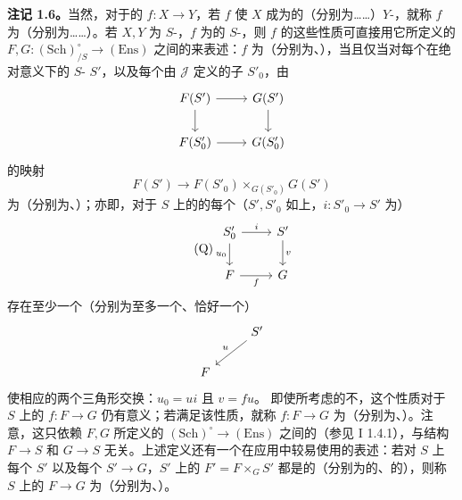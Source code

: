 \textbf{注记 1.6。}当然，对于的 $f:X\to Y$，若 $f$ 使 $X$ 成为的（分别为……）$Y$-，就称 $f$ 为（分别为……）。若 $X,Y$ 为 $S$-，$f$ 为的 $S$-，则 $f$ 的这些性质可直接用它所定义的 $F,G:(\mathrm{Sch})^{\circ}_{/S}\to(\mathrm{Ens})$ 之间的来表述：$f$ 为（分别为、），当且仅当对每个在绝对意义下的 $S$- $S'$，以及每个由 $\mathscr J$ 定义的子 $S'_0$，由
\[\begin{tikzcd}F(S')\arrow[r]\arrow[d]&G(S')\arrow[d]\\F(S'_0)\arrow[r]&G(S'_0)\end{tikzcd}\]
的映射
\[F(S')\longrightarrow F(S'_0)\times_{G(S'_0)}G(S')\]
为（分别为、）；亦即，对于 $S$ 上的的每个（$S',S'_0$ 如上，$i:S'_0\to S'$ 为）
\[\tag{Q}\begin{tikzcd}S'_0\arrow[r,"i"]\arrow[d,"u_0"']&S'\arrow[d,"v"]\\F\arrow[r,"f"']&G\end{tikzcd}\]
存在至少一个（分别为至多一个、恰好一个）
\[\begin{tikzcd}&S'\arrow[dl,"u"']\\F&\end{tikzcd}\]
使相应的两个三角形交换：$u_0=ui$ 且 $v=fu$。
即使所考虑的不，这个性质对于 $S$ 上的 $f:F\to G$ 仍有意义；若满足该性质，就称 $f:F\to G$ 为（分别为、）。注意，这只依赖 $F,G$ 所定义的 $(\mathrm{Sch})^\circ\to(\mathrm{Ens})$ 之间的（参见 I 1.4.1），与结构 $F\to S$ 和 $G\to S$ 无关。上述定义还有一个在应用中较易使用的表述：若对 $S$ 上每个 $S'$ 以及每个 $S'\to G$，$S'$ 上的 $F'=F\times_G S'$ 都是的（分别为的、的），则称 $S$ 上的 $F\to G$ 为（分别为、）。
